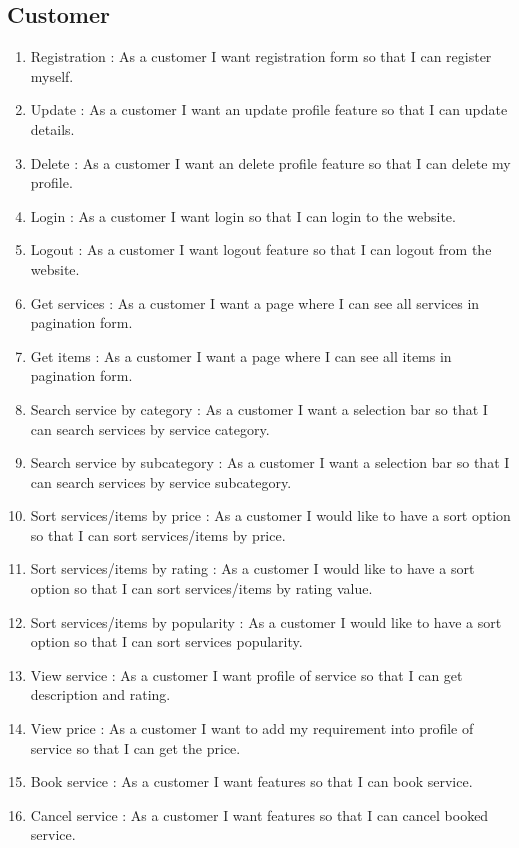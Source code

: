 \documentclass[conference]{IEEEtran}
\begin{document}
\subsection{Customer}
\begin{enumerate}
    \item Registration : As a customer I want registration form so that I can register myself.
    \item Update : As a customer I want an update profile feature so that I can update details.
    \item Delete : As a customer I want an delete profile feature so that I can delete my profile.
    \item Login : As a customer I want login so that I can login to the website.
    \item Logout : As a customer I want logout feature so that I can logout from the website.
    
    \item Get services : As a customer I want a page where I can see all services in pagination form.
    \item Get items : As a customer I want a page where I can see all items in pagination form.
    
    \item Search service by category : As a customer I want a selection bar so that I can search services by service category.
    \item Search service by subcategory : As a customer I want a selection bar so that I can search services by service subcategory.
    \item Sort services/items by price : As a customer I would like to have a sort option so that I can sort services/items by price.
    \item Sort services/items by rating : As a customer I would like to have a sort option so that I can sort services/items by rating value.
    \item Sort services/items by popularity : As a customer I would like to have a sort option so that I can sort services popularity.
    \item View service : As a customer I want profile of service so that I can get description and rating.
    \item View price : As a customer I want to add my requirement into profile of service so that I can get the price.
    \item Book service : As a customer I want features so that I can book service.
    \item Cancel service : As a customer I want features so that I can cancel booked service.
    

\end{enumerate}
\end{document}
